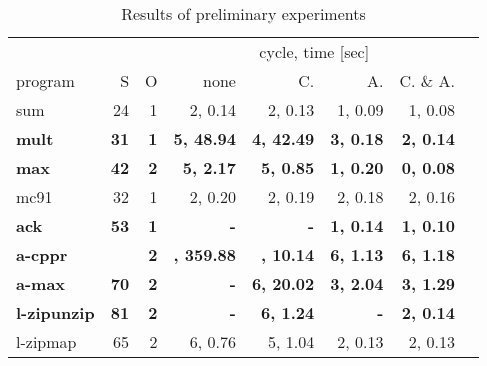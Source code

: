 \begin{table}
\caption{Results of preliminary experiments}
\label{tbl:exp}
\small
\begin{center}
\begin{tabular}{|l|r|r|r|r|r|r|r|}
\hline
            &       &    & \multicolumn{4}{|c|}{cycle, time [sec]} \\
\cline{4-7}
program    & S & O & none &     C. &   A. &    C. \& A. \\
\hline
\!sum        &    24&      1& 2, 0.14 & 2, 0.13 & 1, 0.09 & 1, 0.08 \\
\!\bf  mult       &\bf     31&\bf       1&\bf  5, 48.94 &\bf  4, 42.49 &\bf  3, 0.18 &\bf  2, 0.14 \\
\!\bf  max        &\bf     42&\bf       2&\bf  5, 2.17 &\bf  5, 0.85 &\bf  1, 0.20 &\bf  0, 0.08 \\
\!mc91       &    32&      1& 2, 0.20 & 2, 0.19 & 2, 0.18 & 2, 0.16 \\
\!\bf  ack        &\bf     53&\bf       1&\bf  - &\bf  - &\bf  1, 0.14 &\bf  1, 0.10 \\
\!\bf  a-cppr     & \bf   \!149&\bf       2&\bf  \!\!13, 359.88 &\bf  \!\!12, 10.14 &\bf  6, 1.13 &\bf  6, 1.18 \\
\!\bf  a-max      &\bf     70&\bf       2&\bf  - &\bf  6, 20.02 &\bf  3, 2.04 &\bf  3, 1.29 \\
\!\bf l-zipunzip &\bf     81&\bf       2&\bf  - &\bf  6, 1.24 &\bf  - &\bf  2, 0.14 \\
\!l-zipmap   &    65&      2& 6, 0.76 & 5, 1.04 & 2, 0.13 & 2, 0.13 \\

\end{tabular}
\end{center}
\end{table}
